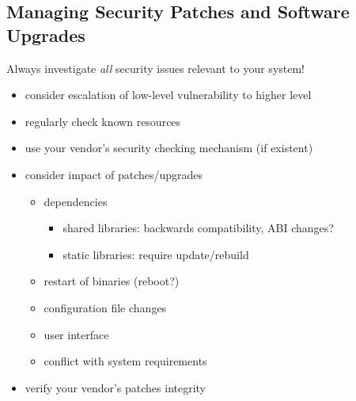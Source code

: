 \documentclass[xga]{xdvislides}
\begin{document}
\subsection{Managing Security Patches and Software Upgrades}
Always investigate {\em all} security issues relevant to your system!
\begin{itemize}
	\item consider escalation of low-level vulnerability to higher level
	\item regularly check known resources
	\item use your vendor's security checking mechanism (if existent)
	\item consider impact of patches/upgrades
		\begin{itemize}
			\item dependencies
				\begin{itemize}
					\item shared libraries:  backwards compatibility, ABI
						changes?
					\item static libraries:  require update/rebuild
				\end{itemize}
			\item restart of binaries (reboot?)
			\item configuration file changes
			\item user interface
			\item conflict with system requirements
		\end{itemize}
	\item verify your vendor's patches integrity
\end{itemize}
\end{document}

